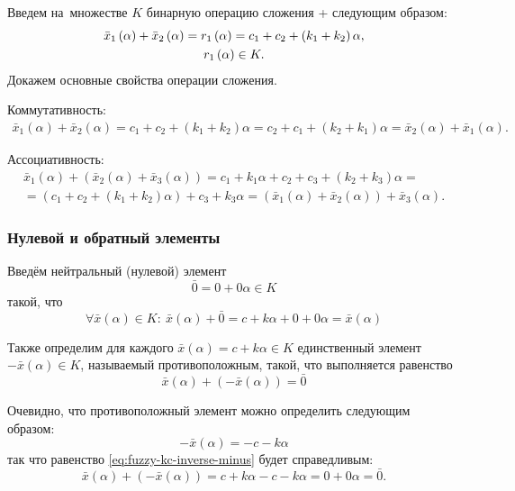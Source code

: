 Введем на~множестве $K$ бинарную операцию сложения + следующим образом:
\begin{gather*}
  \bar{x}_1\left(\alpha \right)+\bar{x}_2\left(\alpha \right)=r_1\left( \alpha  \right)=c_1+c_2+\left(k_1+k_2 \right)\alpha, \notag \\ 
  r_1\left( \alpha  \right)\in K.
\end{gather*}
Докажем основные свойства операции сложения.

Коммутативность:
\begin{gather*}
\bar{x}_1\left( \alpha \right)+\bar{x}_2\left( \alpha \right)=c_1+c_2+\left(k_1+k_2\right)\alpha=c_2+c_1+\left(k_2+k_1 \right)\alpha =\bar{x}_2\left(\alpha \right)+\bar{x}_1\left(\alpha \right).
\end{gather*}

Ассоциативность:
\begin{gather*}
  \bar{x}_1\left(\alpha \right)+\left(\bar{x}_2\left(\alpha \right)+\bar{x}_3\left(\alpha \right) \right)=c_1+k_1\alpha +c_2+c_3+\left(k_2+k_3\right)\alpha={} \\ 
  {}=\left(c_1+c_2+\left(k_1+k_2\right)\alpha \right)+c_3+k_3\alpha =\left(\bar{x}_1\left(\alpha \right)+\bar{x}_2\left(\alpha \right) \right)+\bar{x}_3\left(\alpha \right).
\end{gather*}

\subsubsection*{Нулевой и обратный элементы}

Введём нейтральный (нулевой) элемент
\begin{equation}
\label{eq:fuzzy-kc-zero}
	\bar{0}=0+0\alpha \in K
\end{equation}
такой, что 
\begin{equation}
\label{eq:fuzzy-kc-zeroprop}
	\forall \bar{x}(\alpha )\in K:\ \bar{x}(\alpha )+\bar{0}=c+k\alpha +0+0\alpha =\bar{x}(\alpha )
\end{equation}

Также определим для каждого $\bar{x}\left( \alpha  \right)=c+k\alpha \in K$ единственный элемент $-\bar{x}\left(\alpha \right)\in K$, называемый противоположным, такой, что выполняется равенство
\begin{equation}
\label{eq:fuzzy-kc-inverse-minus}
	\bar{x}\left( \alpha  \right)+\left( -\bar{x}\left( \alpha  \right) \right)=\bar{0}
\end{equation}

Очевидно, что противоположный элемент можно определить следующим образом:
\begin{equation*}
  -\bar{x}\left( \alpha  \right)=-c-k\alpha
\end{equation*}
так что равенство \eqref{eq:fuzzy-kc-inverse-minus} будет справедливым:
\begin{equation*}
	\bar{x}\left( \alpha  \right)+\left( -\bar{x}\left( \alpha  \right) \right)=c+k\alpha -c-k\alpha =0+0\alpha =\bar{0}.
\end{equation*}

